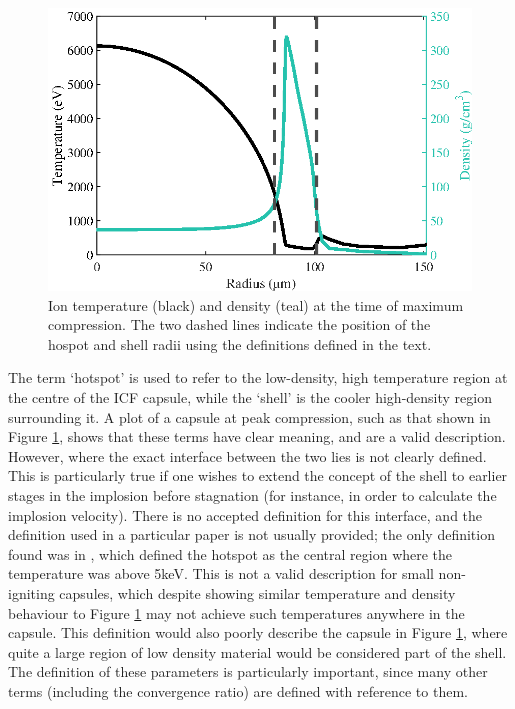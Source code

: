 \begin{figure}[ht]
	\centering
	\includegraphics{figures/LowCR/HSDefn.eps}
	\caption{Ion temperature (black) and density (teal) at the time of maximum compression. The two dashed lines indicate the position of the hospot and shell radii using the definitions defined in the text.}
	\label{fig:HsDefn}
\end{figure}

The term `hotspot' is used to refer to the low-density, high temperature region at the centre of the ICF capsule, while the `shell' is the cooler high-density region surrounding it. A plot of a capsule at peak compression, such as that shown in Figure \ref{fig:HsDefn}, shows that these terms have clear meaning, and are a valid description. However, where the exact interface between the two lies is not clearly defined. This is particularly true if one wishes to extend the concept of the shell to earlier stages in the implosion before stagnation (for instance, in order to calculate the implosion velocity). There is no accepted definition for this interface, and the definition used in a particular paper is not usually provided; the only definition found was in \cite{Olson2021}, which defined the hotspot as the central region where the temperature was above 5keV. This is not a valid description for small non-igniting capsules, which despite showing similar temperature and density behaviour to Figure \ref{fig:HsDefn} may not achieve such temperatures anywhere in the capsule. This definition would also poorly describe the capsule in Figure \ref{fig:HsDefn}, where quite a large region of low density material would be considered part of the shell. The definition of these parameters is particularly important, since many other terms (including the convergence ratio) are defined with reference to them.

